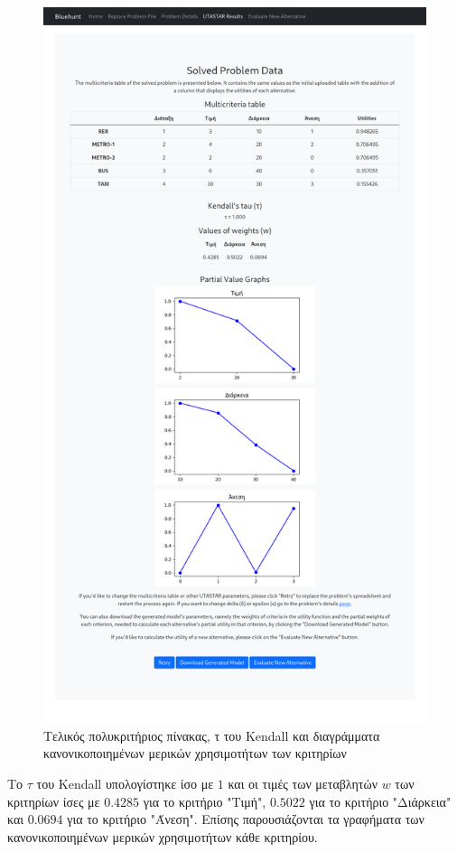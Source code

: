 \documentclass[11pt,a4paper,titlepage]{article}
\numberwithin{equation}{section}
\begin{document}
\begin{figure}[H]
	\centering
	\includegraphics[width=0.8\linewidth]{media/results.png}
	\caption{Τελικός πολυκριτήριος πίνακας, τ του Kendall και διαγράμματα κανονικοποιημένων μερικών χρησιμοτήτων των κριτηρίων}
	\label{fig:results_1_1}
\end{figure}

Το $τ$ του Kendall υπολογίστηκε ίσο με $1$ και οι τιμές των μεταβλητών $w$ των κριτηρίων ίσες με $0.4285$ για το κριτήριο "Τιμή", $0.5022$ για το κριτήριο "Διάρκεια" και $0.0694$ για το κριτήριο "Άνεση". Επίσης παρουσιάζονται τα γραφήματα των κανονικοποιημένων μερικών χρησιμοτήτων κάθε κριτηρίου. 
\end{document}
